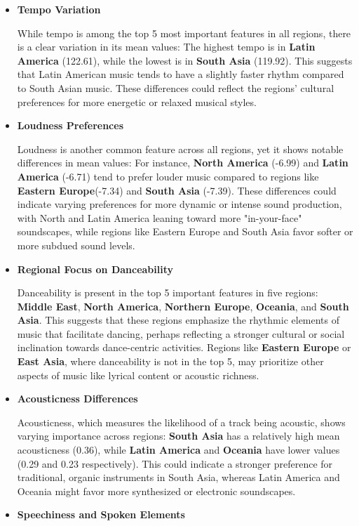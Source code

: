\begin{itemize}
    \item\textbf{Tempo Variation}
    
While tempo is among the top 5 most important features in all regions, there is a clear variation in its mean values:
The highest tempo is in \textbf{Latin America} (122.61), while the lowest is in \textbf{South Asia} (119.92).
This suggests that Latin American music tends to have a slightly faster rhythm compared to South Asian music. These differences could reflect the regions' cultural preferences for more energetic or relaxed musical styles.
\item\textbf{Loudness Preferences}

Loudness is another common feature across all regions, yet it shows notable differences in mean values:
For instance, \textbf{North America} (-6.99) and \textbf{Latin America} (-6.71) tend to prefer louder music compared to regions like \textbf{Eastern Europe}(-7.34) and \textbf{South Asia} (-7.39).
These differences could indicate varying preferences for more dynamic or intense sound production, with North and Latin America leaning toward more "in-your-face" soundscapes, while regions like Eastern Europe and South Asia favor softer or more subdued sound levels.
\item\textbf{Regional Focus on Danceability}

Danceability is present in the top 5 important features in five regions: \textbf{Middle East}, \textbf{North America}, \textbf{Northern Europe}, \textbf{Oceania}, and \textbf{South Asia}.
This suggests that these regions emphasize the rhythmic elements of music that facilitate dancing, perhaps reflecting a stronger cultural or social inclination towards dance-centric activities. Regions like \textbf{Eastern Europe} or \textbf{East Asia}, where danceability is not in the top 5, may prioritize other aspects of music like lyrical content or acoustic richness.
\item\textbf{Acousticness Differences}

Acousticness, which measures the likelihood of a track being acoustic, shows varying importance across regions:
\textbf{South Asia} has a relatively high mean acousticness (0.36), while \textbf{Latin America} and \textbf{Oceania} have lower values (0.29 and 0.23 respectively).
This could indicate a stronger preference for traditional, organic instruments in South Asia, whereas Latin America and Oceania might favor more synthesized or electronic soundscapes.
\item\textbf{Speechiness and Spoken Elements}


\end{itemize}
